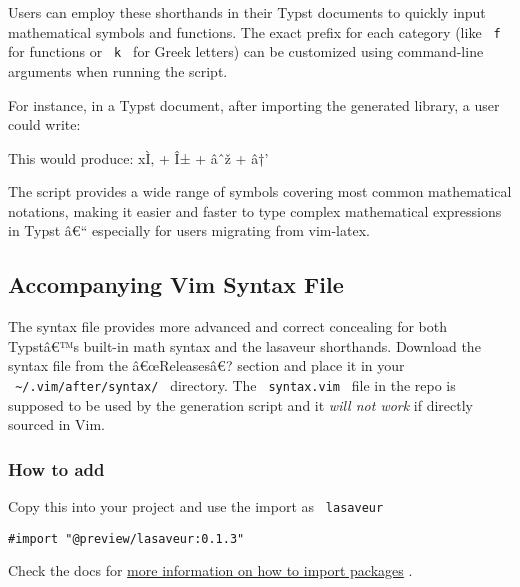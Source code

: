 Users can employ these shorthands in their Typst documents to quickly
input mathematical symbols and functions. The exact prefix for each
category (like \texttt{\ f\ } for functions or \texttt{\ k\ } for Greek
letters) can be customized using command-line arguments when running the
script.

For instance, in a Typst document, after importing the generated
library, a user could write:

\begin{Shaded}
\begin{Highlighting}[]
\end{Highlighting}
\end{Shaded}

This would produce: xÌ‚ + Î± + âˆž + â†'

The script provides a wide range of symbols covering most common
mathematical notations, making it easier and faster to type complex
mathematical expressions in Typst â€`` especially for users migrating
from vim-latex.

\subsection{Accompanying Vim Syntax
File}\label{accompanying-vim-syntax-file}

The syntax file provides more advanced and correct concealing for both
Typstâ€™s built-in math syntax and the lasaveur shorthands. Download the
syntax file from the â€œReleasesâ€? section and place it in your
\texttt{\ \textasciitilde{}/.vim/after/syntax/\ } directory. The
\texttt{\ syntax.vim\ } file in the repo is supposed to be used by the
generation script and it \emph{will not work} if directly sourced in
Vim.

\subsubsection{How to add}\label{how-to-add}

Copy this into your project and use the import as \texttt{\ lasaveur\ }

\begin{verbatim}
#import "@preview/lasaveur:0.1.3"
\end{verbatim}



Check the docs for
\href{https://typst.app/docs/reference/scripting/\#packages}{more
information on how to import packages} .

